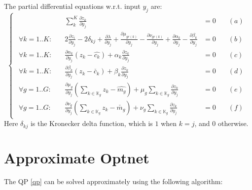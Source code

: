 \documentclass[11 pt]{article}
\begin{document}
The partial differential equations w.r.t. input $y_j$ are:
\begin{equation}\label{eqns_nested_wrt_y_j}
    \begin{cases}
        \begin{aligned}
            & \sum_k^K \frac{\partial z_k}{\partial y_j} & = 0 &\quad (a)\\
            
            \forall k=1..K : \quad & 2\frac{\partial z_i}{\partial y_j} - 2\delta_{kj} + \frac{\partial \lambda}{\partial y_j} + \frac{\partial \mu_{gr(k)}}{\partial y_j} - \frac{\partial \nu_{gr(k)}}{\partial y_j} + \frac{\partial \alpha_k}{\partial y_j} - \frac{\partial \beta_k}{\partial y_j} & = 0 &\quad (b)\\
            
            \forall k=1..K : \quad & \frac{\partial \alpha_k}{\partial y_j}(z_k - \hat{c_k}) + \alpha_k \frac{\partial z_k}{\partial y_j} & = 0 &\quad (c)\\
            
            \forall k=1..K : \quad & \frac{\partial \beta_k}{\partial y_j}(z_k - \check{c_k}) + \beta_k \frac{\partial z_k}{\partial y_j}& = 0 &\quad (d) \\

            \forall g=1..G : \quad & \frac{\partial \mu_g}{\partial y_j}(\sum_{k \in \mathbb{K}_g} z_{k} - \hat{m_{g}}) + \mu_g \sum_{k \in \mathbb{K}_g} \frac{\partial z_k}{\partial y_j}& = 0 &\quad (e) \\

            \forall g=1..G : \quad & \frac{\partial \nu_g}{\partial y_j}(\sum_{k \in \mathbb{K}_g} z_{k} - \check{m_{g}}) + \nu_g \sum_{k \in \mathbb{K}_g} \frac{\partial z_k}{\partial y_j}& = 0 &\quad (f)
        \end{aligned}
    \end{cases}
\end{equation}
Here $\delta_{kj}$ is the Kronecker delta function, which is $1$ when $k=j$, and $0$ otherwise.


\section{Approximate Optnet}
The QP \ref{qp} can be solved approximately using the following algorithm:
\end{document}
